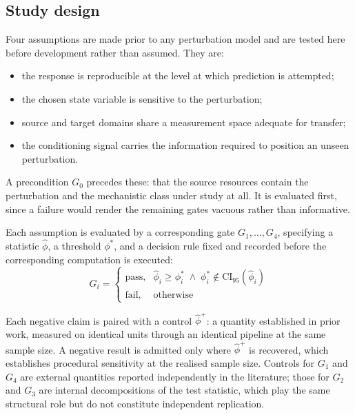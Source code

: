 \documentclass[5p,times,twocolumn]{elsarticle}
\begin{document}
\subsection{\textbf{Study design}}
\label{sec:design}

Four assumptions are made prior to any perturbation model and are tested here
before development rather than assumed. They are:

\begin{itemize}
\item[\textbf{A1}] the response is reproducible at the level at which
prediction is attempted;
\item[\textbf{A2}] the chosen state variable is sensitive to the perturbation;
\item[\textbf{A3}] source and target domains share a measurement space adequate
for transfer;
\item[\textbf{A4}] the conditioning signal carries the information required to
position an unseen perturbation.
\end{itemize}

A precondition $G_0$ precedes these: that the source resources contain the
perturbation and the mechanistic class under study at all. It is evaluated
first, since a failure would render the remaining gates vacuous rather than
informative.

Each assumption is evaluated by a corresponding gate $G_1,\dots,G_4$, specifying
a statistic $\hat{\phi}$, a threshold $\phi^{*}$, and a decision rule fixed and
recorded before the corresponding computation is executed:
\begin{equation}
G_i =
\begin{cases}
\text{pass}, & \hat{\phi}_i \geq \phi_i^{*} \;\wedge\;
               \phi_i^{*} \notin \mathrm{CI}_{95}(\hat{\phi}_i)\\
\text{fail}, & \text{otherwise}
\end{cases}
\label{eq:gate}
\end{equation}

Each negative claim is paired with a control $\hat{\phi}^{+}$: a quantity
established in prior work, measured on identical units through an identical
pipeline at the same sample size. A negative result is admitted only where
$\hat{\phi}^{+}$ is recovered, which establishes procedural sensitivity at the
realised sample size. Controls for $G_1$ and $G_4$ are external quantities
reported independently in the literature; those for $G_2$ and $G_3$ are internal
decompositions of the test statistic, which play the same structural role but do
not constitute independent replication.
\end{document}
